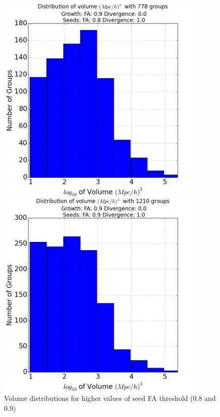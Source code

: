 \documentclass[12pt]{article}
\begin{document}
\begin{figure}[ht]
\centering
\begin{minipage}{.5\textwidth}
  \centering
  \includegraphics[width=0.9\textwidth]{groups/volumeplots/volumes_distr_Mpc_08_Trace_10_search_FA_09_Trace_00.png} %
\end{minipage}%
\begin{minipage}{.5\textwidth}
  \centering
  \includegraphics[width=0.9\textwidth]{groups/volumeplots/volumes_distr_Mpc_09_Trace_10_search_FA_09_Trace_00.png}
\end{minipage}
\label{fg:volume_plots_higher}
\caption{Volume distributions for higher values of seed FA threshold (0.8 and 0.9)}
\end{figure}
\FloatBarrier
\end{document}
